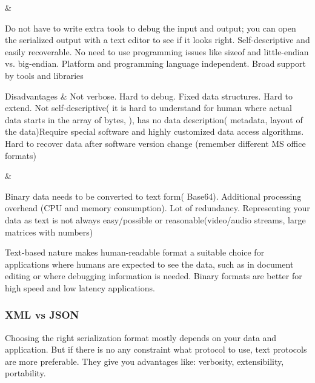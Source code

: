 \begin{longtabu}
		
		&
		
		Do not have to write extra tools to debug the input and output; you can open
		the serialized output with a text editor to see if it looks right. \newline
		Self-descriptive and easily recoverable. \newline
		No need to use programming issues like sizeof and little-endian vs.
		big-endian. \newline
		Platform and programming language independent. \newline
		Broad support by tools and libraries \newline
		
		
		
		
		\tabularnewline
		\hline
		Disadvantages &
		Not verbose. Hard to debug. \newline
		Fixed data structures. Hard to extend. \newline
		Not self-descriptive( it is hard to understand for human where actual data
		starts in the array of bytes, ), has no data description( metadata, layout
		of the data)\newline Require special software and  highly customized data
		access algorithms.
		Hard to recover data after software version change (remember different MS
		office formats)
				
		&
		
		Binary data needs to be converted to text form( Base64). \newline
		Additional processing overhead (CPU and memory consumption). \newline
		Lot of redundancy.
		Representing your data as text is not always easy/possible or
		reasonable(video/audio streams, large matrices with numbers)
				
				
		\tabularnewline
		\hline
	\caption{Comparison of binary and human-readable serialization formats}
	\label{tbl:data_ser_formats}
\end{longtabu}

Text-based nature makes human-readable format a suitable choice
for applications where humans are expected to see the data,
such as in document editing or where debugging information
is needed. Binary formats are better for high speed and low latency
applications.

\subsubsection{XML vs JSON}
\label{sec:xml_vs_json}
Choosing the right serialization format mostly depends on your data and
application. But if there is no any constraint what protocol to use, text
protocols are more preferable. They give you advantages like: verbosity,
extensibility, portability.

